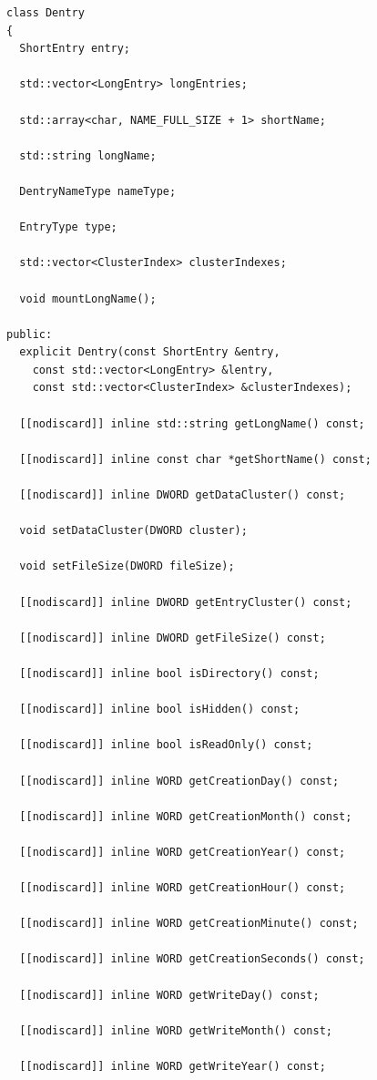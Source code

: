 \documentclass[
    12pt,				%
    oneside,   	        %
    a4paper,			%
    english,			%
    french,				%
    spanish,			%
    brazil,				%
    ]{pacotes/abntex2}
\begin{document}
\begin{lstlisting}[caption={Classe que abstrai entradas longas e curtas em uma única interface}, label={lst:dentry}]
class Dentry
{
  ShortEntry entry;
  
  std::vector<LongEntry> longEntries;

  std::array<char, NAME_FULL_SIZE + 1> shortName;

  std::string longName;

  DentryNameType nameType;

  EntryType type;

  std::vector<ClusterIndex> clusterIndexes;

  void mountLongName();

public:
  explicit Dentry(const ShortEntry &entry,
    const std::vector<LongEntry> &lentry,
    const std::vector<ClusterIndex> &clusterIndexes);

  [[nodiscard]] inline std::string getLongName() const;

  [[nodiscard]] inline const char *getShortName() const;

  [[nodiscard]] inline DWORD getDataCluster() const;

  void setDataCluster(DWORD cluster);

  void setFileSize(DWORD fileSize);

  [[nodiscard]] inline DWORD getEntryCluster() const;

  [[nodiscard]] inline DWORD getFileSize() const;

  [[nodiscard]] inline bool isDirectory() const;

  [[nodiscard]] inline bool isHidden() const;

  [[nodiscard]] inline bool isReadOnly() const;

  [[nodiscard]] inline WORD getCreationDay() const;

  [[nodiscard]] inline WORD getCreationMonth() const;

  [[nodiscard]] inline WORD getCreationYear() const;

  [[nodiscard]] inline WORD getCreationHour() const;

  [[nodiscard]] inline WORD getCreationMinute() const;

  [[nodiscard]] inline WORD getCreationSeconds() const;

  [[nodiscard]] inline WORD getWriteDay() const;

  [[nodiscard]] inline WORD getWriteMonth() const;

  [[nodiscard]] inline WORD getWriteYear() const;


\end{lstlisting}
\end{document}
